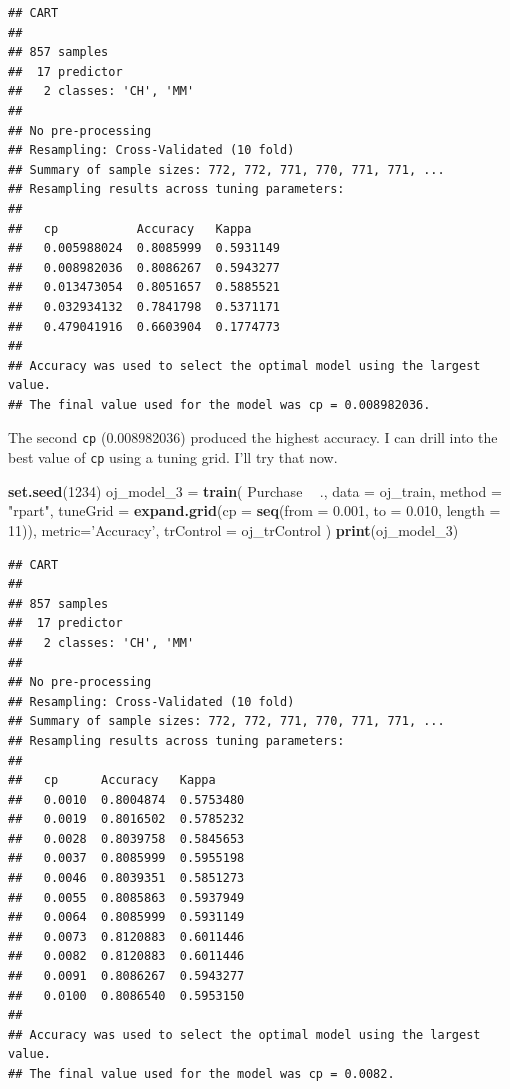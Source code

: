 \documentclass[
]{book}
\newenvironment{Shaded}{\begin{snugshade}}{\end{snugshade}}
\newcommand{\DataTypeTok}[1]{\textcolor[rgb]{0.13,0.29,0.53}{#1}}
\newcommand{\DecValTok}[1]{\textcolor[rgb]{0.00,0.00,0.81}{#1}}
\newcommand{\FloatTok}[1]{\textcolor[rgb]{0.00,0.00,0.81}{#1}}
\newcommand{\KeywordTok}[1]{\textcolor[rgb]{0.13,0.29,0.53}{\textbf{#1}}}
\newcommand{\NormalTok}[1]{#1}
\newcommand{\OperatorTok}[1]{\textcolor[rgb]{0.81,0.36,0.00}{\textbf{#1}}}
\newcommand{\StringTok}[1]{\textcolor[rgb]{0.31,0.60,0.02}{#1}}
\begin{document}
\begin{verbatim}
## CART 
## 
## 857 samples
##  17 predictor
##   2 classes: 'CH', 'MM' 
## 
## No pre-processing
## Resampling: Cross-Validated (10 fold) 
## Summary of sample sizes: 772, 772, 771, 770, 771, 771, ... 
## Resampling results across tuning parameters:
## 
##   cp           Accuracy   Kappa    
##   0.005988024  0.8085999  0.5931149
##   0.008982036  0.8086267  0.5943277
##   0.013473054  0.8051657  0.5885521
##   0.032934132  0.7841798  0.5371171
##   0.479041916  0.6603904  0.1774773
## 
## Accuracy was used to select the optimal model using the largest value.
## The final value used for the model was cp = 0.008982036.
\end{verbatim}

The second \texttt{cp} (0.008982036) produced the highest accuracy. I can drill into the best value of \texttt{cp} using a tuning grid. I'll try that now.

\begin{Shaded}
\begin{Highlighting}[]
\KeywordTok{set.seed}\NormalTok{(}\DecValTok{1234}\NormalTok{)}
\NormalTok{oj_model_}\DecValTok{3}\NormalTok{ =}\StringTok{ }\KeywordTok{train}\NormalTok{(}
\NormalTok{   Purchase }\OperatorTok{~}\StringTok{ }\NormalTok{., }
   \DataTypeTok{data =}\NormalTok{ oj_train, }
   \DataTypeTok{method =} \StringTok{"rpart"}\NormalTok{,}
   \DataTypeTok{tuneGrid =} \KeywordTok{expand.grid}\NormalTok{(}\DataTypeTok{cp =} \KeywordTok{seq}\NormalTok{(}\DataTypeTok{from =} \FloatTok{0.001}\NormalTok{, }\DataTypeTok{to =} \FloatTok{0.010}\NormalTok{, }\DataTypeTok{length =} \DecValTok{11}\NormalTok{)),  }
   \DataTypeTok{metric=}\StringTok{'Accuracy'}\NormalTok{,}
   \DataTypeTok{trControl =}\NormalTok{ oj_trControl}
\NormalTok{   )}
\KeywordTok{print}\NormalTok{(oj_model_}\DecValTok{3}\NormalTok{)}
\end{Highlighting}
\end{Shaded}

\begin{verbatim}
## CART 
## 
## 857 samples
##  17 predictor
##   2 classes: 'CH', 'MM' 
## 
## No pre-processing
## Resampling: Cross-Validated (10 fold) 
## Summary of sample sizes: 772, 772, 771, 770, 771, 771, ... 
## Resampling results across tuning parameters:
## 
##   cp      Accuracy   Kappa    
##   0.0010  0.8004874  0.5753480
##   0.0019  0.8016502  0.5785232
##   0.0028  0.8039758  0.5845653
##   0.0037  0.8085999  0.5955198
##   0.0046  0.8039351  0.5851273
##   0.0055  0.8085863  0.5937949
##   0.0064  0.8085999  0.5931149
##   0.0073  0.8120883  0.6011446
##   0.0082  0.8120883  0.6011446
##   0.0091  0.8086267  0.5943277
##   0.0100  0.8086540  0.5953150
## 
## Accuracy was used to select the optimal model using the largest value.
## The final value used for the model was cp = 0.0082.
\end{verbatim}
\end{document}
